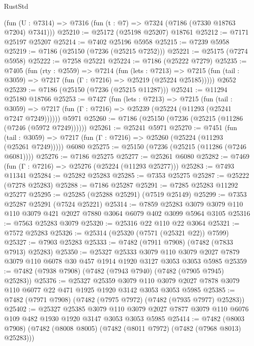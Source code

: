 \begin{lexlean}{RustStd}
\begin{coremodule}
    (fun (U : @7314) => @7316 (fun (t : @7) => @7324 (@7186 (@7330 @18763 @7204) @7341)))
@25210 := @25172 (@25198 @25207) @18761
@25212 := @7171 @25197 @25207
@25214 := @7402 @25196 @5958
@25215 := @7239 @5958
@25219 := @7186 (@25150 (@7236 (@25215 @7252)))
@25221 := @25175 (@7274 @5958)
@25222 := @7258 @25221
@25224 := @7186 (@25222 @7279)
@25235 := @7405
    (fun (rty : @2559) =>
    @7214
      (fun (lets : @7213) =>
      @7215 (fun (tail : @3059) => @7217 (fun (Γ : @7216) => @25219 (@25224 @25185)))))
    @2652
@25239 := @7186 (@25150 (@7236 (@25215 @11287)))
@25241 := @11294 @25180 @18766
@25253 := @7427
    (fun (lets : @7213) =>
    @7215
      (fun (tail : @3059) =>
      @7217 (fun (Γ : @7216) => @25239 (@25224 (@11293 (@25241 @7247 @7249))))))
    @5971
@25260 := @7186 (@25150 (@7236 (@25215 (@11286 (@7246 (@5972 @7249))))))
@25261 := @25241 @5971
@25270 := @7451
    (fun (tail : @3059) => @7217 (fun (Γ : @7216) => @25260 (@25224 (@11293 (@25261 @7249)))))
    @6080
@25275 := @25150 (@7236 (@25215 (@11286 (@7246 @6081))))
@25276 := @7186 @25275
@25277 := @25261 @6080
@25282 := @7469 (fun (Γ : @7216) => @25276 (@25224 (@11293 @25277)))
@25283 := @7493 @11341
@25284 := @25282 @25283
@25285 := @7353 @25275
@25287 := @25222 (@7278 @25283)
@25288 := @7186 @25287
@25291 := @7285 @25283 @11292 @25277
@25295 := @25285 (@25288 @25291) (@7519 @25149)
@25299 := @7353 @25287 @25291 (@7524 @25221)
@25314 := @7859
    @25283
    @3079
    @3079
    @110
    @110
    @3079
    @421
    @2027
    @7880
    @3064
    @6079
    @402
    @3099
    @5964
    @3105
@25316 := @7563 @25283 @3079
@25320 := @25316 @22 @110 @22 @3064
@25321 := @7572 @25283
@25326 := @25314 (@25320 (@7571 (@25321 @22)) @7599)
@25327 := @7903 @25283
@25333 := @7482 (@7911 @7908) (@7482 (@7833 @7913) @25283)
@25350 := @25327
    @25333
    @3079
    @110
    @3079
    @2027
    @7879
    @3079
    @110
    @6078
    @30
    @457
    @1914
    @1920
    @3127
    @3053
    @3053
    @5985
@25359 := @7482 (@7938 @7908) (@7482 (@7943 @7940) (@7482 (@7905 @7945) @25283))
@25376 := @25327
    @25359
    @3079
    @110
    @3079
    @2027
    @7878
    @3079
    @110
    @6077
    @22
    @471
    @1925
    @1920
    @3142
    @3053
    @3053
    @5985
@25385 := @7482 (@7971 @7908) (@7482 (@7975 @7972) (@7482 (@7935 @7977) @25283))
@25402 := @25327
    @25385
    @3079
    @110
    @3079
    @2027
    @7877
    @3079
    @110
    @6076
    @109
    @482
    @1930
    @1920
    @3147
    @3053
    @3053
    @5985
@25414 := @7482
    (@8003 @7908)
    (@7482 (@8008 @8005) (@7482 (@8011 @7972) (@7482 (@7968 @8013) @25283)))

\end{coremodule}
\end{lexlean}
